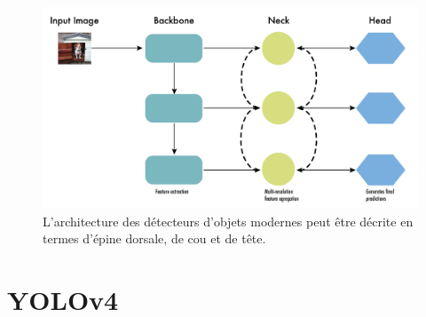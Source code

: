 \documentclass{article}
\begin{document}
\begin{figure}[htbp]
    \centering
    \includegraphics[scale=0.25]{Figures/neck.png}
    \caption{L'architecture des détecteurs d'objets modernes peut être décrite en termes d'épine dorsale, de cou et de tête.}
    \label{fig:neck}
\end{figure}
\vspace{0.6cm}

\section{YOLOv4}
\end{document}
